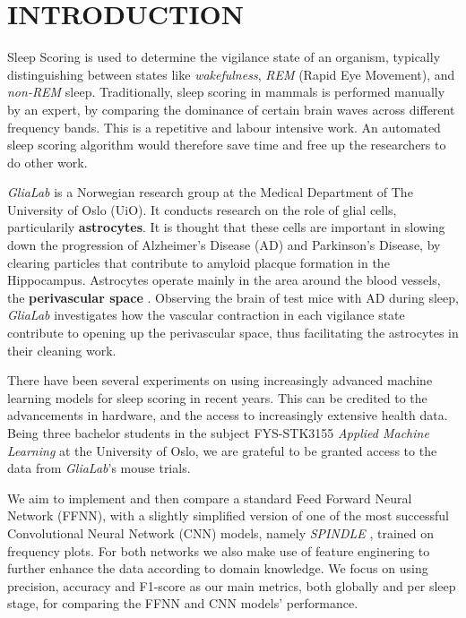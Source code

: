 \documentclass{article}
\begin{document}
\section*{INTRODUCTION}
\begin{multicols}{2}
Sleep Scoring is used to determine the vigilance state of an organism, typically distinguishing between states like \textit{wakefulness}, \textit{REM} (Rapid Eye Movement), and \textit{non-REM} sleep. Traditionally, sleep scoring in mammals is performed manually by an expert, by comparing the dominance of certain brain waves across different frequency bands. This is a repetitive and labour intensive work. An automated sleep scoring algorithm would therefore save time and free up the researchers to do other work.

\textit{GliaLab} is a Norwegian research group at the Medical Department of The University of Oslo (UiO). It conducts research on the role of glial cells, particularily \textbf{astrocytes}. It is thought that these cells are important in slowing down the progression of Alzheimer’s Disease (AD) and Parkinson’s Disease, by clearing particles that contribute to amyloid placque formation in the Hippocampus. \cite{enger_glialab_nodate} Astrocytes operate mainly in the area around the blood vessels, the \textbf{perivascular space} \cite{bojarskaite_sleep_2023}. Observing the brain of test mice with AD during sleep, \textit{GliaLab} investigates how the vascular contraction in each vigilance state contribute to opening up the perivascular space, thus facilitating the astrocytes in their cleaning work. \cite{bojarskaite_sleep_2023}

There have been several experiments on using increasingly advanced machine learning models for sleep scoring in recent years. \cite{alattar_artificial_2024} \cite{aboalayon_sleep_2016} This can be credited to the advancements in hardware, and the access to increasingly extensive health data. \cite{alattar_artificial_2024} Being three bachelor students in the subject FYS-STK3155 \textit{Applied Machine Learning} at the University of Oslo, we are grateful to be granted access to the data from \textit{GliaLab}'s mouse trials. 

We aim to implement and then compare a standard Feed Forward Neural Network (FFNN), with a slightly simplified version of one of the most successful Convolutional Neural Network (CNN) models, namely \textit{SPINDLE} \cite{miladinovic_SPINDLE_2019}, trained on frequency plots. For both networks we also make use of feature enginering to further enhance the data according to domain knowledge. We focus on using precision, accuracy and F1-score as our main metrics, both globally and per sleep stage, for comparing the FFNN and CNN models' performance. \end{multicols}
\end{document}
